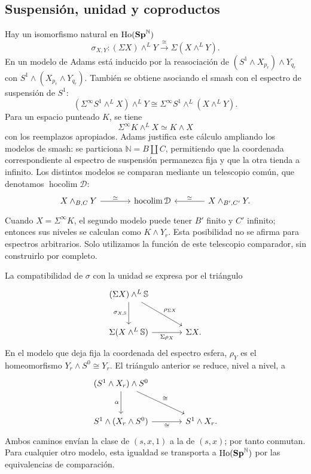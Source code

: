 \subsection{Suspensión, unidad y coproductos}
Hay un isomorfismo natural en $\operatorname{Ho}(\mathbf{Sp}^{\mathbb N})$
\[
\sigma_{X,Y}\colon (\Sigma X)\wedge^L Y\xrightarrow{\cong}
\Sigma(X\wedge^L Y).
\]
En un modelo de Adams está inducido por la reasociación de
$(S^1\wedge X_{p_r})\wedge Y_{q_r}$ con
$S^1\wedge(X_{p_r}\wedge Y_{q_r})$. También se obtiene asociando el smash con el espectro de suspensión de $S^1$:
\[
(\Sigma^\infty S^1\wedge^L X)\wedge^L Y
\cong\Sigma^\infty S^1\wedge^L(X\wedge^L Y).
\]
Para un espacio punteado $K$, se tiene
\[
\Sigma^\infty K\wedge^L X\simeq K\wedge X
\]
con los reemplazos apropiados. Adams justifica este cálculo ampliando los modelos de smash: se particiona $\mathbb N=B\amalg C$, permitiendo que la coordenada correspondiente al espectro de suspensión permanezca fija y que la otra tienda a infinito. Los distintos modelos se comparan mediante un telescopio común, que denotamos $\operatorname{hocolim}\mathcal D$:
\[
\begin{tikzcd}[column sep=large]
X\wedge_{B,C}Y\arrow[r,"\simeq"]&\operatorname{hocolim}\mathcal D
&X\wedge_{B',C'}Y\arrow[l,"\simeq"'] .
\end{tikzcd}
\]
Cuando $X=\Sigma^\infty K$, el segundo modelo puede tener $B'$ finito y $C'$ infinito; entonces sus niveles se calculan como $K\wedge Y_r$. Esta posibilidad no se afirma para espectros arbitrarios. Solo utilizamos la función de este telescopio comparador, sin construirlo por completo.

La compatibilidad de $\sigma$ con la unidad se expresa por el triángulo
\[
\begin{tikzcd}[column sep=large,row sep=large]
(\Sigma X)\wedge^L\mathbb S\arrow[d,"\sigma_{X,\mathbb S}"']\arrow[dr,"\rho_{\Sigma X}"]&\\
\Sigma(X\wedge^L\mathbb S)\arrow[r,"\Sigma\rho_X"']&\Sigma X.
\end{tikzcd}
\]
En el modelo que deja fija la coordenada del espectro esfera, $\rho_Y$ es el homeomorfismo $Y_r\wedge S^0\cong Y_r$. El triángulo anterior se reduce, nivel a nivel, a
\[
\begin{tikzcd}[column sep=large,row sep=large]
(S^1\wedge X_r)\wedge S^0\arrow[d,"\alpha"']\arrow[dr,"\cong"]&\\
S^1\wedge(X_r\wedge S^0)\arrow[r,"\cong"']&S^1\wedge X_r.
\end{tikzcd}
\]
Ambos caminos envían la clase de $(s,x,1)$ a la de $(s,x)$; por tanto conmutan. Para cualquier otro modelo, esta igualdad se transporta a $\operatorname{Ho}(\mathbf{Sp}^{\mathbb N})$ por las equivalencias de comparación.

